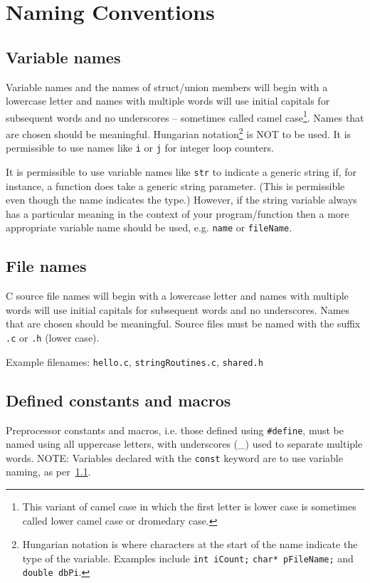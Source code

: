 \documentclass{article}
\begin{document}
\section{Naming Conventions}
\subsection{Variable names}
\label{sec:naming-variable}
Variable names and the names of struct/union members will begin with a lowercase letter and names with multiple words 
will use initial capitals for subsequent words and no underscores -- sometimes called camel case\footnote{This variant of camel case 
in which the first letter is lower case is sometimes called lower camel case or dromedary case.}. 
Names that are chosen should be meaningful. Hungarian notation\footnote{Hungarian notation is where characters at the start of 
the name indicate the type of the variable. Examples include \texttt{int iCount;} \texttt{char* pFileName;} and
\texttt{double dbPi}.}
 is NOT to be used.
It is permissible to use names like \texttt{i} or \texttt{j} for integer loop counters.
\nolinenumbers
{}

\linenumbers


It is permissible to use variable names like \texttt{str} to indicate a generic string if, for instance, a function does take a generic
string parameter. (This is permissible even though the name indicates the type.) However, if the string variable always has a particular meaning in the context of your program/function then a more appropriate variable name should
be used, e.g. \texttt{name} or \texttt{fileName}.

\subsection{File names}
\label{sec:naming-files}
C source file names will begin with a lowercase letter and names with multiple words 
will use initial capitals for subsequent words and no underscores. 
Names that are chosen should be meaningful. Source files must be named with the suffix \texttt{.c} or \texttt{.h} (lower case).

Example filenames: \texttt{hello.c}, \texttt{stringRoutines.c}, \texttt{shared.h}

\subsection{Defined constants and macros}
\label{sec:naming-constants}
Preprocessor constants and macros, i.e. those defined using \texttt{\#define}, must be named 
using all uppercase letters, with underscores (\_) used to separate multiple words.
NOTE: Variables declared with the \texttt{const} keyword are to use variable naming, as 
per~\ref{sec:naming-variable}.
\end{document}
